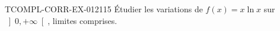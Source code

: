 \begin{exercice}{TCOMPL-CORR-EX-012}{1}{15}
Étudier les variations de $f(x) = x\ln x$ sur $\left]0, +\infty\right[$, limites comprises.

\end{exercice}
